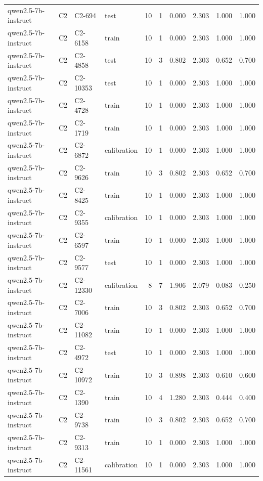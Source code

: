 \begin{table}
\begin{tabular}{llllrrrrrr}
qwen2.5-7b-instruct & C2 & C2-694 & test & 10 & 1 & 0.000 & 2.303 & 1.000 & 1.000 \\
qwen2.5-7b-instruct & C2 & C2-6158 & train & 10 & 1 & 0.000 & 2.303 & 1.000 & 1.000 \\
qwen2.5-7b-instruct & C2 & C2-4858 & test & 10 & 3 & 0.802 & 2.303 & 0.652 & 0.700 \\
qwen2.5-7b-instruct & C2 & C2-10353 & test & 10 & 1 & 0.000 & 2.303 & 1.000 & 1.000 \\
qwen2.5-7b-instruct & C2 & C2-4728 & train & 10 & 1 & 0.000 & 2.303 & 1.000 & 1.000 \\
qwen2.5-7b-instruct & C2 & C2-1719 & train & 10 & 1 & 0.000 & 2.303 & 1.000 & 1.000 \\
qwen2.5-7b-instruct & C2 & C2-6872 & calibration & 10 & 1 & 0.000 & 2.303 & 1.000 & 1.000 \\
qwen2.5-7b-instruct & C2 & C2-9626 & train & 10 & 3 & 0.802 & 2.303 & 0.652 & 0.700 \\
qwen2.5-7b-instruct & C2 & C2-8425 & train & 10 & 1 & 0.000 & 2.303 & 1.000 & 1.000 \\
qwen2.5-7b-instruct & C2 & C2-9355 & calibration & 10 & 1 & 0.000 & 2.303 & 1.000 & 1.000 \\
qwen2.5-7b-instruct & C2 & C2-6597 & train & 10 & 1 & 0.000 & 2.303 & 1.000 & 1.000 \\
qwen2.5-7b-instruct & C2 & C2-9577 & test & 10 & 1 & 0.000 & 2.303 & 1.000 & 1.000 \\
qwen2.5-7b-instruct & C2 & C2-12330 & calibration & 8 & 7 & 1.906 & 2.079 & 0.083 & 0.250 \\
qwen2.5-7b-instruct & C2 & C2-7006 & train & 10 & 3 & 0.802 & 2.303 & 0.652 & 0.700 \\
qwen2.5-7b-instruct & C2 & C2-11082 & train & 10 & 1 & 0.000 & 2.303 & 1.000 & 1.000 \\
qwen2.5-7b-instruct & C2 & C2-4972 & test & 10 & 1 & 0.000 & 2.303 & 1.000 & 1.000 \\
qwen2.5-7b-instruct & C2 & C2-10972 & train & 10 & 3 & 0.898 & 2.303 & 0.610 & 0.600 \\
qwen2.5-7b-instruct & C2 & C2-1390 & train & 10 & 4 & 1.280 & 2.303 & 0.444 & 0.400 \\
qwen2.5-7b-instruct & C2 & C2-9738 & train & 10 & 3 & 0.802 & 2.303 & 0.652 & 0.700 \\
qwen2.5-7b-instruct & C2 & C2-9313 & train & 10 & 1 & 0.000 & 2.303 & 1.000 & 1.000 \\
qwen2.5-7b-instruct & C2 & C2-11561 & calibration & 10 & 1 & 0.000 & 2.303 & 1.000 & 1.000 \\

\end{tabular}
\end{table}
